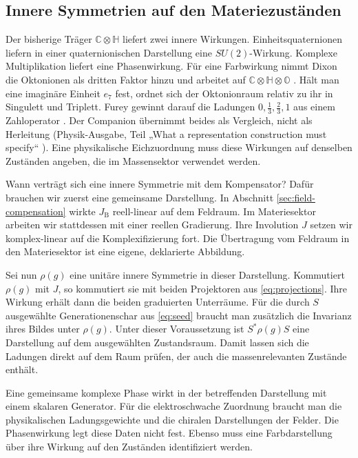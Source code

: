 \subsection{Innere Symmetrien auf den Materiezuständen}
\label{sec:gauge}

Der bisherige Träger \(\mathbb C\otimes\mathbb H\) liefert zwei innere Wirkungen. Einheitsquaternionen liefern in einer quaternionischen Darstellung eine \(SU(2)\)-Wirkung. Komplexe Multiplikation liefert eine Phasenwirkung. Für eine Farbwirkung nimmt Dixon die Oktonionen als dritten Faktor hinzu und arbeitet auf \(\mathbb C\otimes\mathbb H\otimes\mathbb O\) \cite{dixon}. Hält man eine imaginäre Einheit \(e_7\) fest, ordnet sich der Oktonionraum relativ zu ihr in Singulett und Triplett. Furey gewinnt darauf die Ladungen \(0,\tfrac13,\tfrac23,1\) aus einem Zahloperator \cite{furey}. Der Companion übernimmt beides als Vergleich, nicht als Herleitung (Physik-Ausgabe, Teil „What a representation construction must specify“ \cite{physics}). Eine physikalische Eichzuordnung muss diese Wirkungen auf denselben Zuständen angeben, die im Massensektor verwendet werden.

Wann verträgt sich eine innere Symmetrie mit dem Kompensator? Dafür brauchen wir zuerst eine gemeinsame Darstellung. In Abschnitt \ref{sec:field-compensation} wirkte \(J_{\mathrm B}\) reell-linear auf dem Feldraum. Im Materiesektor arbeiten wir stattdessen mit einer reellen Gradierung. Ihre Involution \(J\) setzen wir komplex-linear auf die Komplexifizierung fort. Die Übertragung vom Feldraum in den Materiesektor ist eine eigene, deklarierte Abbildung.

Sei nun \(\rho(g)\) eine unitäre innere Symmetrie in dieser Darstellung. Kommutiert \(\rho(g)\) mit \(J\), so kommutiert sie mit beiden Projektoren aus \eqref{eq:projections}. Ihre Wirkung erhält dann die beiden graduierten Unterräume. Für die durch \(S\) ausgewählte Generationenschar aus \eqref{eq:seed} braucht man zusätzlich die Invarianz ihres Bildes unter \(\rho(g)\). Unter dieser Voraussetzung ist \(S^*\rho(g)S\) eine Darstellung auf dem ausgewählten Zustandsraum. Damit lassen sich die Ladungen direkt auf dem Raum prüfen, der auch die massenrelevanten Zustände enthält.

Eine gemeinsame komplexe Phase wirkt in der betreffenden Darstellung mit einem skalaren Generator. Für die elektroschwache Zuordnung braucht man die physikalischen Ladungsgewichte und die chiralen Darstellungen der Felder. Die Phasenwirkung legt diese Daten nicht fest. Ebenso muss eine Farbdarstellung über ihre Wirkung auf den Zuständen identifiziert werden.

